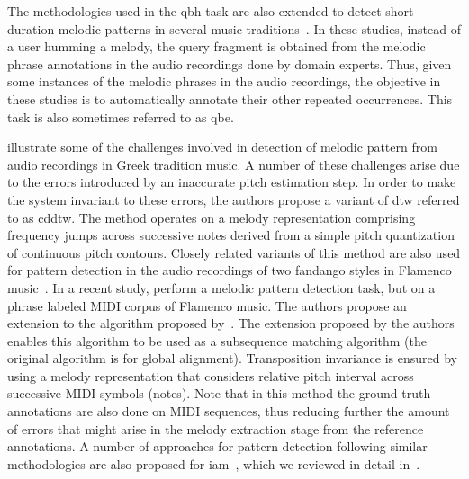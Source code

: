 The methodologies used in the \gls{qbh} task are also extended to detect short-duration melodic patterns in several music traditions~\citep{pikrakis2003recognition,pikrakis2012tracking,pikrakis2016detection,Ross2012b,dutta2014modified}. In these studies, instead of a user humming a melody, the query fragment is obtained from the melodic phrase annotations in the audio recordings done by domain experts. Thus, given some instances of the melodic phrases in the audio recordings, the objective in these studies is to automatically annotate their other repeated occurrences. This task is also sometimes referred to as \gls{qbe}. 

\cite{pikrakis2003recognition} illustrate some of the challenges involved in detection of melodic pattern from audio recordings in Greek tradition music. A number of these challenges arise due to the errors introduced by an inaccurate pitch estimation step. In order to make the system invariant to these errors, the authors propose a variant of \gls{dtw} referred to as \gls{cddtw}. The method operates on a melody representation comprising frequency jumps across successive notes derived from a simple pitch quantization of continuous pitch contours. Closely related variants of this method are also used for pattern detection in the audio recordings of two fandango styles in Flamenco music~\citep{pikrakis2012tracking,gomez2012automatic}. In a recent study, \cite{pikrakis2016detection} perform a melodic pattern detection task, but on a phrase labeled MIDI corpus of Flamenco music. The authors propose an extension to the algorithm proposed by~\cite{needleman1970general}. The extension proposed by the authors enables this algorithm to be used as a subsequence matching algorithm (the original algorithm is for global alignment). Transposition invariance is ensured by using a melody representation that considers relative pitch interval across successive MIDI symbols (notes). Note that in this method the ground truth annotations are also done on MIDI sequences, thus reducing further the amount of errors that might arise in the melody extraction stage from the reference annotations. A number of approaches for pattern detection following similar methodologies are also proposed for \gls{iam}~\citep{Ross2012b,dutta2014modified,ganguli2015efficient}, which we reviewed in detail in~. 

